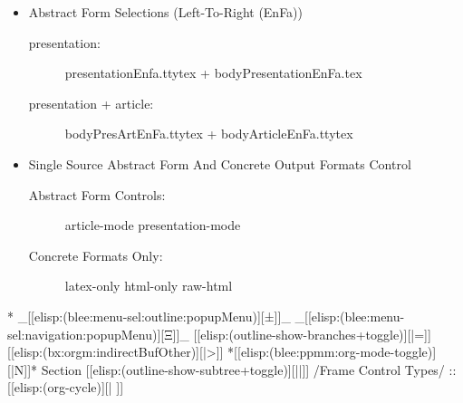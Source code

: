 \begin{whenOrg}
\begin{verblatex}
\begin{frame}[fragile,plain,label=UnifiedSourceControllingAllResults]
    \begin{itemize}
    \item Abstract Form Selections (Left-To-Right (EnFa))
      \begin{description}
      \item[presentation:] presentationEnfa.ttytex + bodyPresentationEnFa.tex
      \item[presentation + article:]  bodyPresArtEnFa.ttytex + bodyArticleEnFa.ttytex
      \end{description}
    \end{itemize}

    \begin{itemize}
    \item Single Source Abstract Form And Concrete Output Formats Control
      \begin{description}
      \item[Abstract Form Controls:] article-mode presentation-mode
      \item[Concrete Formats Only:] latex-only html-only raw-html
      \end{description}
    \end{itemize}




\end{frame}
\end{verblatex}


\begin{whenOrg}
*  _[[elisp:(blee:menu-sel:outline:popupMenu)][±]]_ _[[elisp:(blee:menu-sel:navigation:popupMenu)][Ξ]]_ [[elisp:(outline-show-branches+toggle)][|=]] [[elisp:(bx:orgm:indirectBufOther)][|>]] *[[elisp:(blee:ppmm:org-mode-toggle)][|N]]*  Section    [[elisp:(outline-show-subtree+toggle)][||]]   /Frame Control Types/ ::  [[elisp:(org-cycle)][| ]]
\end{whenOrg}


\end{whenOrg}
